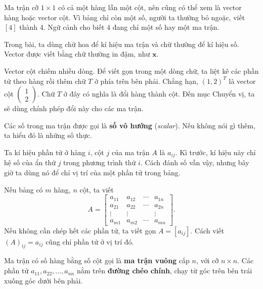 \documentclass[12pt,a4paper]{article}
\begin{document}
Ma trận cỡ \(1\times1\) có cả một hàng lẫn một cột, nên cũng có thể xem là vector hàng hoặc vector cột. Vì bảng chỉ còn một số, người ta thường bỏ ngoặc, viết \([4]\) thành \(4\). Ngữ cảnh cho biết \(4\) đang chỉ một số hay một ma trận.

Trong bài, ta dùng chữ hoa để kí hiệu ma trận và chữ thường để kí hiệu số. Vector được viết bằng chữ thường in đậm, như \(\mathbf{x}\).

Vector cột chiếm nhiều dòng. Để viết gọn trong một dòng chữ, ta liệt kê các phần tử theo hàng rồi thêm chữ \(T\) ở phía trên bên phải. Chẳng hạn, \((1,2)^T\) là vector cột \(\left(\begin{array}{r}1\\2\end{array}\right)\). Chữ \(T\) ở đây có nghĩa là đổi hàng thành cột. Đến mục Chuyển vị, ta sẽ dùng chính phép đổi này cho các ma trận.

Các số trong ma trận được gọi là \textbf{số vô hướng} (\emph{scalar}). Nếu không nói gì thêm, ta hiểu đó là những số thực.

Ta kí hiệu phần tử ở hàng \(i\), cột \(j\) của ma trận \(A\) là \(a_{ij}\). Kì trước, kí hiệu này chỉ hệ số của ẩn thứ \(j\) trong phương trình thứ \(i\). Cách đánh số vẫn vậy, nhưng bây giờ ta dùng nó để chỉ vị trí của một phần tử trong bảng.

Nếu bảng có \(m\) hàng, \(n\) cột, ta viết
$$
A=\left[ \begin{array}{cccc}
a_{11} & a_{12} & \cdots & a_{1n}\\
a_{21} & a_{22} & \cdots & a_{2n}\\
\vdots & \vdots & & \vdots\\
a_{m1} & a_{m2} & \cdots & a_{mn}
\end{array} \right].
$$
Nếu không cần chép hết các phần tử, ta viết gọn \(A=[a_{ij}]\). Cách viết \((A)_{ij}=a_{ij}\) cũng chỉ phần tử ở vị trí đó.

Ma trận có số hàng bằng số cột gọi là \textbf{ma trận vuông} cấp \(n\), với cỡ \(n\times n\). Các phần tử \(a_{11},a_{22},\ldots,a_{nn}\) nằm trên \textbf{đường chéo chính}, chạy từ góc trên bên trái xuống góc dưới bên phải.
\end{document}
